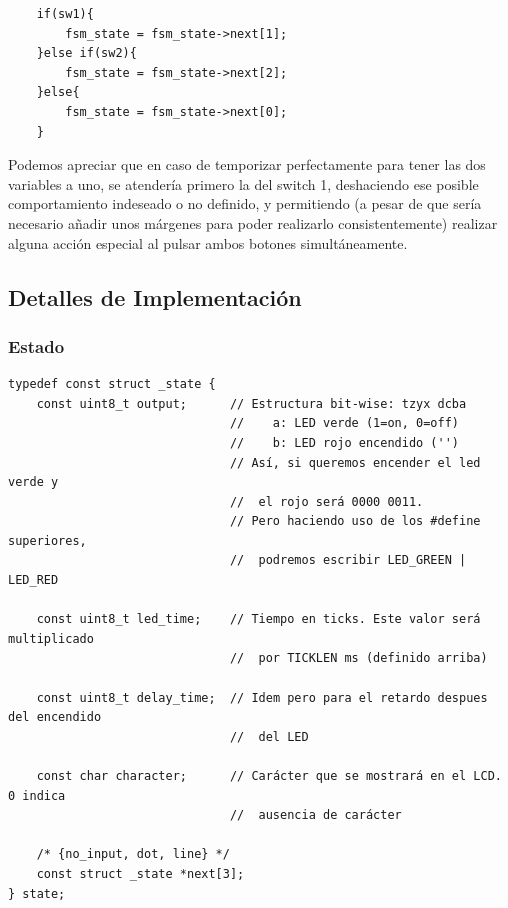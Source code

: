 \documentclass[a4paper,openright,12pt]{article}
\begin{document}
\begin{verbatim}
    if(sw1){
        fsm_state = fsm_state->next[1];
    }else if(sw2){
        fsm_state = fsm_state->next[2];
    }else{
        fsm_state = fsm_state->next[0];
    }
\end{verbatim}

Podemos apreciar que en caso de temporizar perfectamente para tener las dos variables a uno, se atendería primero la del switch 1, deshaciendo ese posible comportamiento
indeseado o no definido, y permitiendo (a pesar de que sería necesario añadir unos márgenes para poder realizarlo consistentemente) realizar alguna acción especial al pulsar ambos
botones simultáneamente.

\subsection{Detalles de Implementación}
\subsubsection{Estado}
\begin{verbatim}
typedef const struct _state {
    const uint8_t output;      // Estructura bit-wise: tzyx dcba
                               //    a: LED verde (1=on, 0=off)
                               //    b: LED rojo encendido ('')
                               // Así, si queremos encender el led verde y
                               //  el rojo será 0000 0011.
                               // Pero haciendo uso de los #define superiores,
                               //  podremos escribir LED_GREEN | LED_RED 

    const uint8_t led_time;    // Tiempo en ticks. Este valor será multiplicado
                               //  por TICKLEN ms (definido arriba)

    const uint8_t delay_time;  // Idem pero para el retardo despues del encendido
                               //  del LED
    
    const char character;      // Carácter que se mostrará en el LCD. 0 indica
                               //  ausencia de carácter
    
    /* {no_input, dot, line} */
    const struct _state *next[3];
} state;
\end{verbatim}
\end{document}
